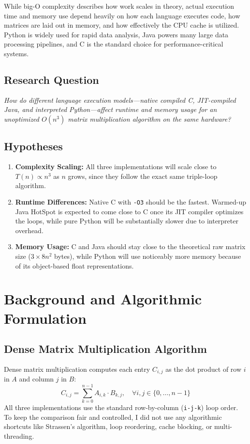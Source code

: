 \documentclass[10pt,conference,a4paper]{IEEEtran}
\begin{document}
While big-O complexity describes how work scales in theory, actual execution time and memory use depend heavily on how each language executes code, how matrices are laid out in memory, and how effectively the CPU cache is utilized. Python is widely used for rapid data analysis, Java powers many large data processing pipelines, and C is the standard choice for performance-critical systems.

\subsection{Research Question}
\textit{How do different language execution models---native compiled C, JIT-compiled Java, and interpreted Python---affect runtime and memory usage for an unoptimized $O(n^3)$ matrix multiplication algorithm on the same hardware?}

\subsection{Hypotheses}
\begin{enumerate}
    \item \textbf{Complexity Scaling:} All three implementations will scale close to $T(n) \propto n^3$ as $n$ grows, since they follow the exact same triple-loop algorithm.
    \item \textbf{Runtime Differences:} Native C with \texttt{-O3} should be the fastest. Warmed-up Java HotSpot is expected to come close to C once its JIT compiler optimizes the loops, while pure Python will be substantially slower due to interpreter overhead.
    \item \textbf{Memory Usage:} C and Java should stay close to the theoretical raw matrix size ($3 \times 8n^2$ bytes), while Python will use noticeably more memory because of its object-based float representations.
\end{enumerate}

\section{Background and Algorithmic Formulation}

\subsection{Dense Matrix Multiplication Algorithm}
Dense matrix multiplication computes each entry $C_{i,j}$ as the dot product of row $i$ in $A$ and column $j$ in $B$:
\begin{equation}
C_{i,j} = \sum_{k=0}^{n-1} A_{i,k} \cdot B_{k,j}, \quad \forall i, j \in \{0, \dots, n-1\}
\end{equation}
All three implementations use the standard row-by-column (\texttt{i-j-k}) loop order. To keep the comparison fair and controlled, I did not use any algorithmic shortcuts like Strassen's algorithm, loop reordering, cache blocking, or multi-threading.
\end{document}
